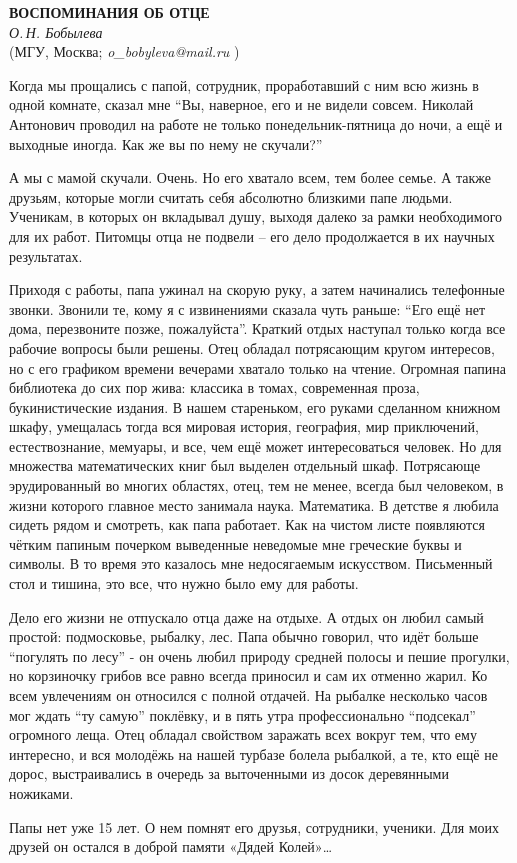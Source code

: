 \begin{center}{ \bf  ВОСПОМИНАНИЯ ОБ ОТЦЕ}\\
{\it О.\,Н. Бобылева} \\
(МГУ, Москва; {\it o\_bobyleva@mail.ru } )
\end{center}

Когда мы прощались с папой, сотрудник, проработавший с ним всю жизнь в одной комнате, сказал мне “Вы, наверное, его и не видели совсем. Николай Антонович проводил на работе не только понедельник-пятница до ночи, а ещё и выходные иногда. Как же вы по нему не скучали?”

А мы с мамой скучали. Очень. Но его хватало всем, тем более семье. А также друзьям, которые могли считать себя абсолютно близкими папе людьми. Ученикам, в которых он вкладывал душу, выходя далеко за рамки необходимого для их работ. Питомцы отца не подвели – его дело продолжается в их научных результатах.

Приходя с работы, папа ужинал на скорую руку, а затем начинались телефонные звонки. Звонили те, кому я с извинениями сказала чуть раньше: “Его ещё нет дома, перезвоните позже, пожалуйста”. Краткий отдых наступал только когда все рабочие вопросы были решены. Отец обладал потрясающим кругом интересов, но с его графиком времени вечерами хватало только на чтение. Огромная папина библиотека до сих пор жива: классика в томах, современная проза, букинистические издания. В нашем стареньком, его руками сделанном книжном шкафу, умещалась тогда вся мировая история, география, мир приключений, естествознание, мемуары, и все, чем ещё может интересоваться человек. Но для множества математических книг был выделен отдельный шкаф. Потрясающе эрудированный во многих областях, отец, тем не менее, всегда был человеком, в жизни которого главное место занимала наука. Математика. В детстве я любила сидеть рядом и смотреть, как папа работает. Как на чистом листе появляются чётким папиным почерком выведенные неведомые мне греческие буквы и символы. В то время это казалось мне недосягаемым искусством. Письменный стол и тишина, это все, что нужно было ему для работы.

Дело его жизни не отпускало отца даже на отдыхе. А отдых он любил самый простой: подмосковье, рыбалку, лес. Папа обычно говорил, что идёт больше “погулять по лесу” - он очень любил природу средней полосы и пешие прогулки, но корзиночку грибов все равно всегда приносил и сам их отменно жарил. Ко всем увлечениям он относился с полной отдачей. На рыбалке несколько часов мог ждать “ту самую” поклёвку, и в пять утра профессионально “подсекал” огромного леща. Отец обладал свойством заражать всех вокруг тем, что ему интересно, и вся молодёжь на нашей турбазе болела рыбалкой, а те, кто ещё не дорос, выстраивались в очередь за выточенными из досок деревянными ножиками.

Папы нет уже 15 лет. О нем помнят его друзья, сотрудники, ученики. Для моих друзей он остался в доброй памяти «Дядей Колей»…
